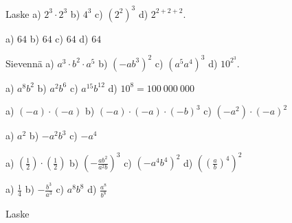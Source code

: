 \begin{tehtavasivu}
    \begin{tehtava}
        Laske \quad
        a) $2^3\cdot2^3$ \qquad
        b) $4^3$ \qquad
        c) $(2^2)^3$ \qquad
        d) $2^{2+2+2}$.

        \begin{vastaus}
            a) $64$ \qquad
            b) $64$ \qquad
            c) $64$ \qquad
            d) $64$
        \end{vastaus}
    \end{tehtava}

\begin{tehtava}
        Sievennä \quad
        a) $a^3\cdot b^2\cdot a^5$ \qquad 
        b) $(-ab^3)^2$ \qquad 
        c) $(a^5a^4)^3$ \qquad 
        d) $10^{2^3}$.

        \begin{vastaus}
            a) $a^8b^2$ \qquad
            b) $a^2b^6$ \qquad
            c) $a^{15}b^{12}$ \qquad
            d) $10^8 = 100~000~000$
        \end{vastaus}
    \end{tehtava}

    \begin{tehtava}
        a) $(-a)\cdot(-a)$ \qquad
        b) $(-a)\cdot(-a)\cdot(-b)^3$ \qquad
        c) $(-a^2)\cdot(-a)^2$

        \begin{vastaus}
            a) $a^2$ \qquad
            b) $-a^2b^3$ \qquad
            c) $-a^4$
        \end{vastaus}
    \end{tehtava}

 \begin{tehtava}
        a) $(\frac{1}{2})\cdot(\frac{1}{2})$ \qquad
        b) $(-\frac{ab^2}{a^2b})^3$ \qquad
        c) $(-a^4b^4)^2$ \qquad
        d) $\left((\frac{a}{b})^4\right)^2$
        
        \begin{vastaus}
            a) $\frac{1}{4}$ \qquad
            b) $-\frac{b^3}{a^3}$ \qquad
            c) $a^8b^8$ \qquad
            d) $\frac{a^8}{b^8}$
        \end{vastaus}
    \end{tehtava}

\begin{tehtava}
	Laske
	\begin{alakohdat}
	\end{alakohdat}
	

\end{tehtava}
\end{tehtavasivu}
